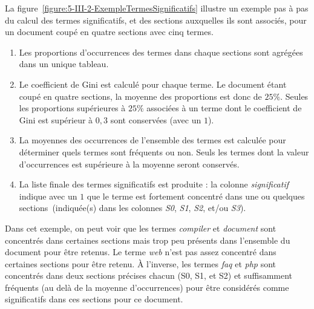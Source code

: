 \medskip

La figure~\ref{figure:5-III-2-ExempleTermesSignificatifs} illustre un exemple pas à pas du calcul des termes significatifs, et des sections auxquelles ils sont associés, pour un document coupé en quatre sections avec cinq termes.
\begin{enumerate}
\item Les proportions d'occurrences des termes dans chaque sections sont agrégées dans un unique tableau.
\item Le coefficient de Gini est calculé pour chaque terme.
Le document étant coupé en quatre sections, la moyenne des proportions est donc de $ 25\% $.
Seules les proportions supérieures à $ 25\% $ associées à un terme dont le coefficient de Gini est supérieur à $ 0,3 $ sont conservées (avec un $ 1 $).
\item La moyennes des occurrences de l'ensemble des termes est calculée pour déterminer quels termes sont fréquents ou non.
Seuls les termes dont la valeur d'occurrences est supérieure à la moyenne seront conservés.
\item La liste finale des termes significatifs est produite : la colonne \textit{significatif} indique avec un $ 1 $ que le terme est fortement concentré dans une ou quelques sections~(indiquée(s) dans les colonnes \textit{S0}, \textit{S1}, \textit{S2}, et/ou \textit{S3}).
\end{enumerate}
Dans cet exemple, on peut voir que les termes \textit{compiler} et \textit{document} sont concentrés dans certaines sections mais trop peu présents dans l'ensemble du document pour être retenus.
Le terme \textit{web} n'est pas assez concentré dans certaines sections pour être retenu.
À l'inverse, les termes \textit{faq} et \textit{php} sont concentrés dans deux sections précises chacun (S0, S1, et S2) et suffisamment fréquents (au delà de la moyenne d'occurrences) pour être considérés comme significatifs dans ces sections pour ce document.

\bigskip

